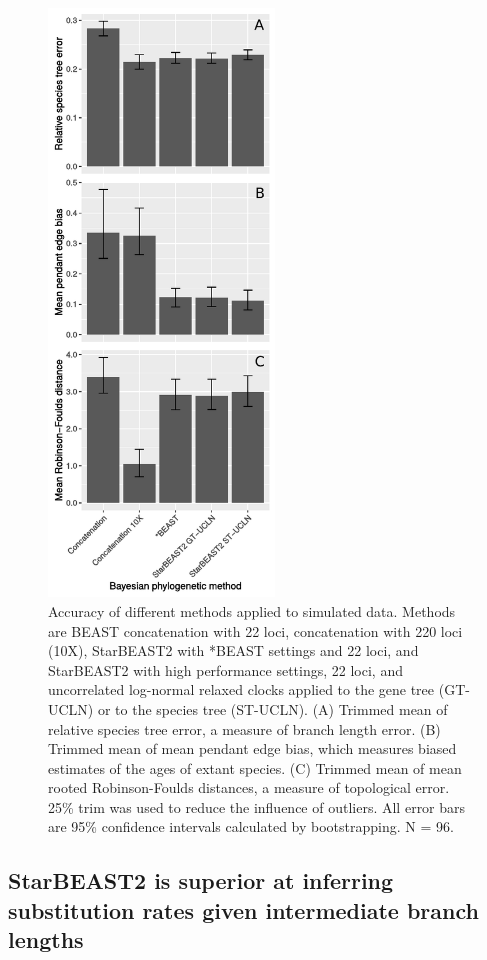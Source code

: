 \documentclass[12pt]{article}
\begin{document}
\begin{figure}[htb!]
\centering
\includegraphics[width=6cm]{tree_error.pdf}
\caption
{Accuracy of different methods applied to simulated data. Methods are BEAST concatenation with 22 loci, concatenation with 220 loci
(10X), StarBEAST2 with *BEAST settings and 22 loci, and StarBEAST2 with
high performance settings, 22 loci, and uncorrelated log-normal relaxed clocks applied
to the gene tree (GT-UCLN) or to the species tree (ST-UCLN). (A) Trimmed mean of
relative species tree error, a measure of branch length error. (B) Trimmed
mean of mean pendant edge bias, which measures biased estimates of the ages of
extant species. (C) Trimmed mean of mean rooted Robinson-Foulds distances, a
measure of topological error. 25\% trim was used to reduce the
influence of outliers. All error bars are 95\% confidence intervals calculated
by bootstrapping. N = 96.}
\label{fig:speciesTreeError}
\end{figure}

\subsection{StarBEAST2 is superior at inferring substitution rates given intermediate branch lengths}
\end{document}
